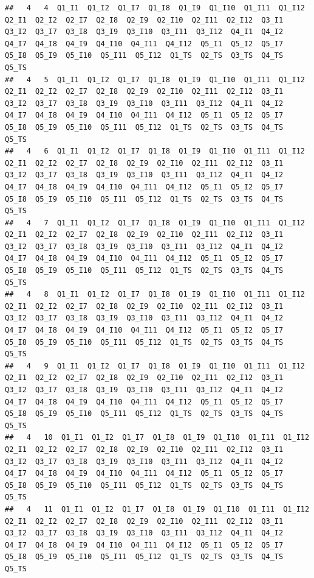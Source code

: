 \documentclass[]{book}
\begin{document}
\begin{verbatim}
##   4   4  Q1_I1  Q1_I2  Q1_I7  Q1_I8  Q1_I9  Q1_I10  Q1_I11  Q1_I12  Q2_I1  Q2_I2  Q2_I7  Q2_I8  Q2_I9  Q2_I10  Q2_I11  Q2_I12  Q3_I1  Q3_I2  Q3_I7  Q3_I8  Q3_I9  Q3_I10  Q3_I11  Q3_I12  Q4_I1  Q4_I2  Q4_I7  Q4_I8  Q4_I9  Q4_I10  Q4_I11  Q4_I12  Q5_I1  Q5_I2  Q5_I7  Q5_I8  Q5_I9  Q5_I10  Q5_I11  Q5_I12  Q1_TS  Q2_TS  Q3_TS  Q4_TS  Q5_TS
##   4   5  Q1_I1  Q1_I2  Q1_I7  Q1_I8  Q1_I9  Q1_I10  Q1_I11  Q1_I12  Q2_I1  Q2_I2  Q2_I7  Q2_I8  Q2_I9  Q2_I10  Q2_I11  Q2_I12  Q3_I1  Q3_I2  Q3_I7  Q3_I8  Q3_I9  Q3_I10  Q3_I11  Q3_I12  Q4_I1  Q4_I2  Q4_I7  Q4_I8  Q4_I9  Q4_I10  Q4_I11  Q4_I12  Q5_I1  Q5_I2  Q5_I7  Q5_I8  Q5_I9  Q5_I10  Q5_I11  Q5_I12  Q1_TS  Q2_TS  Q3_TS  Q4_TS  Q5_TS
##   4   6  Q1_I1  Q1_I2  Q1_I7  Q1_I8  Q1_I9  Q1_I10  Q1_I11  Q1_I12  Q2_I1  Q2_I2  Q2_I7  Q2_I8  Q2_I9  Q2_I10  Q2_I11  Q2_I12  Q3_I1  Q3_I2  Q3_I7  Q3_I8  Q3_I9  Q3_I10  Q3_I11  Q3_I12  Q4_I1  Q4_I2  Q4_I7  Q4_I8  Q4_I9  Q4_I10  Q4_I11  Q4_I12  Q5_I1  Q5_I2  Q5_I7  Q5_I8  Q5_I9  Q5_I10  Q5_I11  Q5_I12  Q1_TS  Q2_TS  Q3_TS  Q4_TS  Q5_TS
##   4   7  Q1_I1  Q1_I2  Q1_I7  Q1_I8  Q1_I9  Q1_I10  Q1_I11  Q1_I12  Q2_I1  Q2_I2  Q2_I7  Q2_I8  Q2_I9  Q2_I10  Q2_I11  Q2_I12  Q3_I1  Q3_I2  Q3_I7  Q3_I8  Q3_I9  Q3_I10  Q3_I11  Q3_I12  Q4_I1  Q4_I2  Q4_I7  Q4_I8  Q4_I9  Q4_I10  Q4_I11  Q4_I12  Q5_I1  Q5_I2  Q5_I7  Q5_I8  Q5_I9  Q5_I10  Q5_I11  Q5_I12  Q1_TS  Q2_TS  Q3_TS  Q4_TS  Q5_TS
##   4   8  Q1_I1  Q1_I2  Q1_I7  Q1_I8  Q1_I9  Q1_I10  Q1_I11  Q1_I12  Q2_I1  Q2_I2  Q2_I7  Q2_I8  Q2_I9  Q2_I10  Q2_I11  Q2_I12  Q3_I1  Q3_I2  Q3_I7  Q3_I8  Q3_I9  Q3_I10  Q3_I11  Q3_I12  Q4_I1  Q4_I2  Q4_I7  Q4_I8  Q4_I9  Q4_I10  Q4_I11  Q4_I12  Q5_I1  Q5_I2  Q5_I7  Q5_I8  Q5_I9  Q5_I10  Q5_I11  Q5_I12  Q1_TS  Q2_TS  Q3_TS  Q4_TS  Q5_TS
##   4   9  Q1_I1  Q1_I2  Q1_I7  Q1_I8  Q1_I9  Q1_I10  Q1_I11  Q1_I12  Q2_I1  Q2_I2  Q2_I7  Q2_I8  Q2_I9  Q2_I10  Q2_I11  Q2_I12  Q3_I1  Q3_I2  Q3_I7  Q3_I8  Q3_I9  Q3_I10  Q3_I11  Q3_I12  Q4_I1  Q4_I2  Q4_I7  Q4_I8  Q4_I9  Q4_I10  Q4_I11  Q4_I12  Q5_I1  Q5_I2  Q5_I7  Q5_I8  Q5_I9  Q5_I10  Q5_I11  Q5_I12  Q1_TS  Q2_TS  Q3_TS  Q4_TS  Q5_TS
##   4   10  Q1_I1  Q1_I2  Q1_I7  Q1_I8  Q1_I9  Q1_I10  Q1_I11  Q1_I12  Q2_I1  Q2_I2  Q2_I7  Q2_I8  Q2_I9  Q2_I10  Q2_I11  Q2_I12  Q3_I1  Q3_I2  Q3_I7  Q3_I8  Q3_I9  Q3_I10  Q3_I11  Q3_I12  Q4_I1  Q4_I2  Q4_I7  Q4_I8  Q4_I9  Q4_I10  Q4_I11  Q4_I12  Q5_I1  Q5_I2  Q5_I7  Q5_I8  Q5_I9  Q5_I10  Q5_I11  Q5_I12  Q1_TS  Q2_TS  Q3_TS  Q4_TS  Q5_TS
##   4   11  Q1_I1  Q1_I2  Q1_I7  Q1_I8  Q1_I9  Q1_I10  Q1_I11  Q1_I12  Q2_I1  Q2_I2  Q2_I7  Q2_I8  Q2_I9  Q2_I10  Q2_I11  Q2_I12  Q3_I1  Q3_I2  Q3_I7  Q3_I8  Q3_I9  Q3_I10  Q3_I11  Q3_I12  Q4_I1  Q4_I2  Q4_I7  Q4_I8  Q4_I9  Q4_I10  Q4_I11  Q4_I12  Q5_I1  Q5_I2  Q5_I7  Q5_I8  Q5_I9  Q5_I10  Q5_I11  Q5_I12  Q1_TS  Q2_TS  Q3_TS  Q4_TS  Q5_TS

\end{verbatim}
\end{document}
